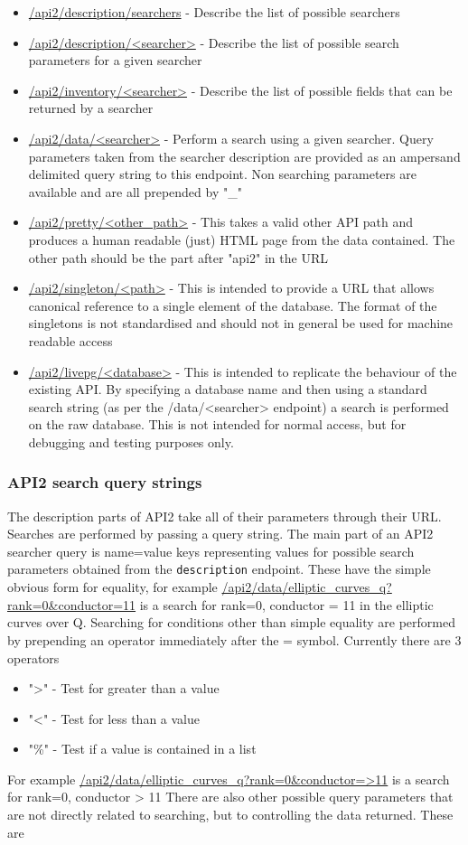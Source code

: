 \documentclass[11pt]{article}
\begin{document}
\begin{itemize}
\item \url{/api2/description/searchers} - Describe the list of possible searchers
\item \url{/api2/description/<searcher>} - Describe the list of possible search parameters for a given searcher
\item \url{/api2/inventory/<searcher>} - Describe the list of possible fields that can be returned by a searcher
\item \url{/api2/data/<searcher>} - Perform a search using a given searcher. Query parameters taken from the searcher description are provided as an ampersand delimited query string to this endpoint. Non searching parameters are available and are all prepended by "\_"
\item \url{/api2/pretty/<other_path>} - This takes a valid other API path and produces a human readable (just) HTML page from the data contained. The other path should be the part after "api2" in the URL
\item \url{/api2/singleton/<path>} - This is intended to provide a URL that allows canonical reference to a single element of the database. The format of the singletons is not standardised and should not in general be used for machine readable access
\item \url{/api2/livepg/<database>} - This is intended to replicate the behaviour of the existing API. By specifying a database name and then using a standard search string (as per the /data/<searcher> endpoint) a search is performed on the raw database. This is not intended for normal access, but for debugging and testing purposes only.
\end{itemize}

\subsubsection{API2 search query strings}
The description parts of API2 take all of their parameters through their URL. Searches are performed by passing a query string. The main part of an API2 searcher query is name=value keys representing values for possible search parameters obtained from the \texttt{description} endpoint. These have the simple obvious form for equality, for example \url{/api2/data/elliptic_curves_q?rank=0&conductor=11} is a search for rank=0, conductor = 11 in the elliptic curves over Q. Searching for conditions other than simple equality are performed by prepending an operator immediately after the = symbol. Currently there are 3 operators
\begin{itemize}
\item ">" - Test for greater than a value
\item "<" - Test for less than a value
\item "\%" - Test if a value is contained in a list
\end{itemize}
For example \url{/api2/data/elliptic_curves_q?rank=0&conductor=>11} is a search for rank=0, conductor > 11
There are also other possible query parameters that are not directly related to searching, but to controlling the data returned. These are
\end{document}
